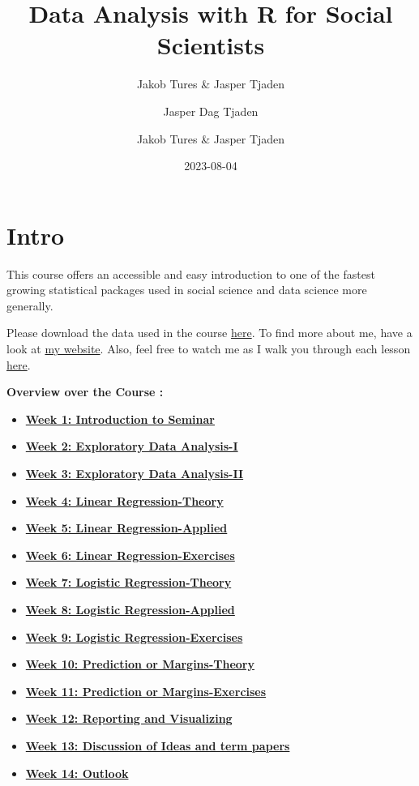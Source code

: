 \documentclass[
]{book}
\title{Data Analysis with R for Social Scientists}
\author{Jakob Tures \& Jasper Tjaden}
\author{Jasper Dag Tjaden}
\author{Jakob Tures \& Jasper Tjaden}
\date{2023-08-04}
\providecommand{\tightlist}{%
  \setlength{\itemsep}{0pt}\setlength{\parskip}{0pt}}
\begin{document}
\maketitle

{
\setcounter{tocdepth}{1}
\tableofcontents
}
\hypertarget{intro}{%
\chapter*{Intro}\label{intro}}

This course offers an accessible and easy introduction to one of the fastest growing statistical packages used in social science and data science more generally.

Please download the data used in the course \href{https://www.worldvaluessurvey.org/WVSDocumentationWV7.jsp}{here}. To find more about me, have a look at \href{https://jaspertjaden.com}{my website}. Also, feel free to watch me as I walk you through each lesson \href{https://www.youtube.com/playlist?list=PLr43hk2e3hFMg4tZdJsN0qzG5YkQB3A1c}{here}.

\textbf{Overview over the Course :}

\begin{itemize}
\tightlist
\item
  \textbf{\protect\hyperlink{intro-sem}{Week 1: Introduction to Seminar}}
\item
  \textbf{\protect\hyperlink{eda-1}{Week 2: Exploratory Data Analysis-I}}
\item
  \textbf{\protect\hyperlink{eda-2}{Week 3: Exploratory Data Analysis-II}}
\item
  \textbf{\protect\hyperlink{lin-t}{Week 4: Linear Regression-Theory}}
\item
  \textbf{\protect\hyperlink{lin-a}{Week 5: Linear Regression-Applied}}
\item
  \textbf{\protect\hyperlink{lin-e}{Week 6: Linear Regression-Exercises}}
\item
  \textbf{\protect\hyperlink{log-t}{Week 7: Logistic Regression-Theory}}
\item
  \textbf{\protect\hyperlink{log-a}{Week 8: Logistic Regression-Applied}}
\item
  \textbf{\protect\hyperlink{log-e}{Week 9: Logistic Regression-Exercises}}
\item
  \textbf{\protect\hyperlink{pm-t}{Week 10: Prediction or Margins-Theory}}
\item
  \textbf{\protect\hyperlink{pm-e}{Week 11: Prediction or Margins-Exercises}}
\item
  \textbf{\protect\hyperlink{report-v}{Week 12: Reporting and Visualizing}}
\item
  \textbf{\protect\hyperlink{dis-paper}{Week 13: Discussion of Ideas and term papers}}
\item
  \textbf{\protect\hyperlink{out-look}{Week 14: Outlook}}
\end{itemize}
\end{document}

